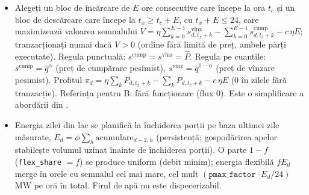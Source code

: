 \begin{itemize}
\item[\textbf{B}] %
{Alegeți un bloc de încărcare de $E$ ore consecutive care începe la ora $t_c$ și un bloc de descărcare care începe la $t_x\ge t_c+E$, cu $t_x+E\le24$, care maximizează valoarea semnalului
$V=\eta\sum_{k=0}^{E-1}s^{\text{vînz}}_{d,t_x+k}-\sum_{k=0}^{E-1}s^{\text{cump}}_{d,t_c+k}-c\,\eta E$; tranzacționați numai dacă $V>0$ (ordine fără limită de preț, ambele părți executate).
Regula punctuală: $s^{\text{cump}}=s^{\text{vînz}}=\hat P$. Regula pe cuantile: $s^{\text{cump}}=\hat q^{\alpha}$ (preț de cumpărare pesimist), $s^{\text{vînz}}=\hat q^{1-\alpha}$ (preț de vînzare pesimist).
Profitul $\pi_d=\eta\sum_k P_{d,t_x+k}-\sum_k P_{d,t_c+k}-c\,\eta E$ (0 în zilele fără tranzacție). Referința pentru B: fără funcționare (flux 0). Este o simplificare a abordării din \cite{Uniejewski2021,Serafin2024}.}
\item[\textbf{H}] %
{Energia zilei din lac se planifică la închiderea porții pe baza ultimei zile măsurate, $E_d=\phi\sum_h\text{acumulare}_{d-2,h}$ (persistență; gospodărirea apelor stabilește volumul uzinat înainte de închiderea porții). O parte $1-f$ (\texttt{flex\_share} $=f$) se produce uniform (debit minim);
energia flexibilă $fE_d$ merge în orele cu semnalul cel mai mare, cel mult $(\texttt{pmax\_factor}\cdot E_d/24)$ MW pe oră în total. Firul de apă nu este dispecerizabil.
}
\end{itemize}
